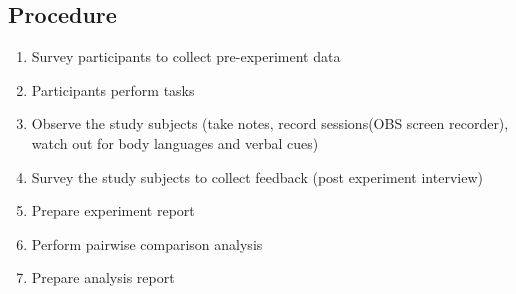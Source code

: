 \documentclass[letterpaper,cleveref]{lipics-v2019}
\theoremstyle{definition}
\begin{document}
\subsection {Procedure}
\begin {enumerate}

\item Survey participants to collect pre-experiment data
\item Participants perform tasks
\item Observe the study subjects (take notes, record sessions(OBS screen recorder), watch out for body languages and verbal cues)
\item Survey the study subjects to collect feedback (post experiment interview)
\item Prepare experiment report
\item Perform pairwise comparison analysis
\item Prepare analysis report
\end {enumerate}

\end{document}

